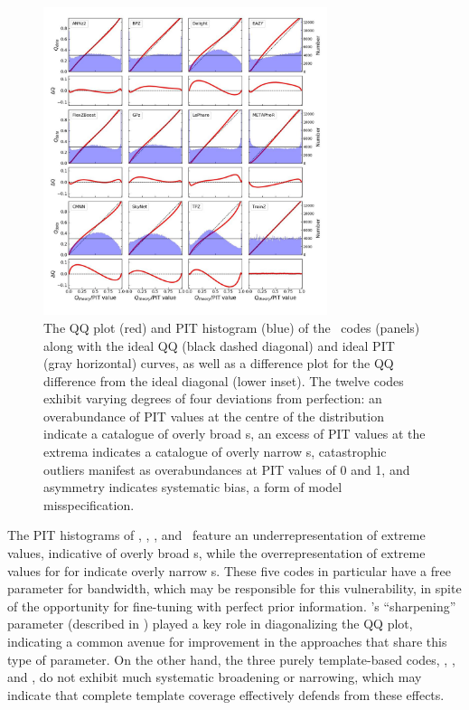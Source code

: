 \begin{figure}
	\centering
	\includegraphics[width=0.74\textwidth]{figures/pzdc1/PITANDQQplot_12codes_crop.jpg}
	\caption{The QQ plot (red) and PIT histogram (blue) of the \pzpdf\ codes (panels) along with the ideal QQ (black dashed diagonal) and ideal PIT (gray horizontal) curves, as well as a difference plot for the QQ difference from the ideal diagonal (lower inset).
		The twelve codes exhibit varying degrees of four deviations from perfection: an overabundance of PIT values at the centre of the distribution indicate a catalogue of overly broad \pzpdf s, an excess of PIT values at the extrema indicates a catalogue of overly narrow \pzpdf s, catastrophic outliers manifest as overabundances at PIT values of 0 and 1, and asymmetry indicates systematic bias, a form of model misspecification.}
\end{figure}

The PIT histograms of \delight, \cmnn, \skynet, and \tpz\ feature an underrepresentation of extreme values, indicative of overly broad \pzpdf s, while the overrepresentation of extreme values for for \metaphor indicate overly narrow \pzpdf s.
These five codes in particular have a free parameter for bandwidth, which may be responsible for this vulnerability, in spite of the opportunity for fine-tuning with perfect prior information.
\flexzboost's ``sharpening'' parameter (described in ) played a key role in diagonalizing the QQ plot, indicating a common avenue for improvement in the approaches that share this type of parameter.
On the other hand, the three purely template-based codes, \bpz, \eazy, and \lephare, do not exhibit much systematic broadening or narrowing, which may indicate that complete template coverage effectively defends from these effects.

